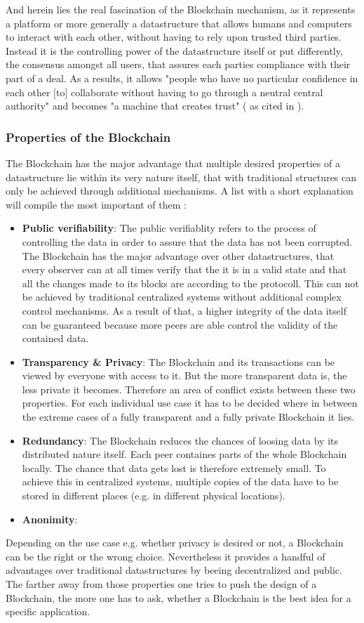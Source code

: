 And herein lies the real fascination of the Blockchain mechanism, as it represents a platform or more generally a datastructure that allows humans and computers to interact with each other, without having to rely upon trusted third parties. Instead it is the controlling power of the datastructure itself or put differently, the consensus amongst all users, that assures each parties compliance with their part of a deal. As a results, it allows "people who have no particular confidence in each other [to] collaborate without having to go through a neutral central authority" and becomes "a machine that creates trust" (\cite{Economist2015} as cited in \cite{Shackelford2016}).
\subsubsection{Properties of the Blockchain}
The Blockchain has the major advantage that multiple desired properties of a datastructure lie within its very nature itself, that with traditional structures can only be achieved through additional mechanisms. A list with a short explanation will compile the most important of them \cite{Wust2017}:
\begin{itemize}
	\item \textbf{Public verifiability}: The public verifiablity refers to the process of controlling the data in order to assure that the data has not been corrupted. The Blockchain has the major advantage over other datastructures, that every observer can at all times verify that the it is in a valid state and that all the changes made to its blocks are according to the protocoll. This can not be achieved by traditional centralized systems without additional complex control mechanisms.
	  As a result of that, a higher integrity of the data itself can be guaranteed because more peers are able control the validity of the contained data.
	\item \textbf{Transparency \& Privacy}: The Blockchain and its transactions can be viewed by everyone with access to it. But the more transparent data is, the less private it becomes. Therefore an area of conflict exists between these two properties. For each individual use case it has to be decided where in between the extreme cases of a fully transparent and a fully private Blockchain it lies.
	
	\item \textbf{Redundancy}: The Blockchain reduces the chances of loosing data by its distributed nature itself. Each peer containes parts of the whole Blockchain locally. The chance that data gets lost is therefore extremely small. To achieve this in centralized systems, multiple copies of the data have to be stored in different places (e.g. in different physical locations).
	\item \textbf{Anonimity}: 
\end{itemize}
Depending on the use case e.g. whether privacy is desired or not, a Blockchain can be the right or the wrong choice. Nevertheless it provides a handful of advantages over traditional datastructures by beeing decentralized and public. The farther away from those properties one tries to push the design of a Blockchain, the more one has to ask, whether a Blockchain is the best idea for a specific application.

